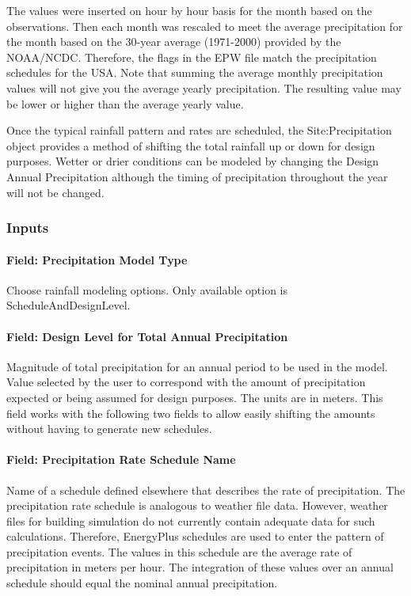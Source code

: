 The values were inserted on hour by hour basis for the month based on the observations. Then each month was rescaled to meet the average precipitation for the month based on the 30-year average (1971-2000) provided by the NOAA/NCDC. Therefore, the flags in the EPW file match the precipitation schedules for the USA. Note that summing the average monthly precipitation values will not give you the average yearly precipitation. The resulting value may be lower or higher than the average yearly value.

Once the typical rainfall pattern and rates are scheduled, the Site:Precipitation object provides a method of shifting the total rainfall up or down for design purposes. Wetter or drier conditions can be modeled by changing the Design Annual Precipitation although the timing of precipitation throughout the year will not be changed.

\subsubsection{Inputs}\label{inputs-22-002}

\paragraph{Field: Precipitation Model Type}\label{field-precipitation-model-type}

Choose rainfall modeling options. Only available option is ScheduleAndDesignLevel.

\paragraph{Field: Design Level for Total Annual Precipitation}\label{field-design-level-for-total-annual-precipitation}

Magnitude of total precipitation for an annual period to be used in the model. Value selected by the user to correspond with the amount of precipitation expected or being assumed for design purposes. The units are in meters. This field works with the following two fields to allow easily shifting the amounts without having to generate new schedules.

\paragraph{Field: Precipitation Rate Schedule Name}\label{field-precipitation-rate-schedule-name}

Name of a schedule defined elsewhere that describes the rate of precipitation. The precipitation rate schedule is analogous to weather file data. However, weather files for building simulation do not currently contain adequate data for such calculations. Therefore, EnergyPlus schedules are used to enter the pattern of precipitation events. The values in this schedule are the average rate of precipitation in meters per hour. The integration of these values over an annual schedule should equal the nominal annual precipitation.

